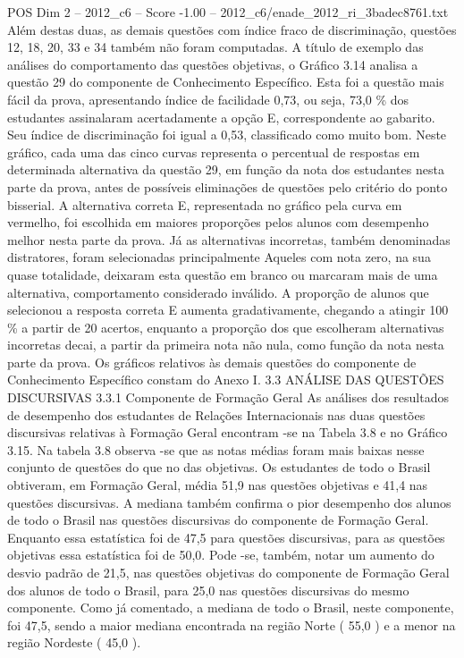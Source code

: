 \begin{textsample}{POS Dim 2 – 2012\_c6 – Score -1.00 – 2012\_c6/enade\_2012\_ri\_3badec8761.txt}
Além destas duas, as demais questões com índice fraco de discriminação, questões 12, 18, 20, 33 e 34 também não foram computadas.
A título de exemplo das análises do comportamento das questões objetivas, o Gráfico 3.14 analisa a questão 29 do componente de Conhecimento Específico.
Esta foi a questão mais fácil da prova, apresentando índice de facilidade 0,73, ou seja, 73,0 \% dos estudantes assinalaram acertadamente a opção E, correspondente ao gabarito.
Seu índice de discriminação foi igual a 0,53, classificado como muito bom.
Neste gráfico, cada uma das cinco curvas representa o percentual de respostas em determinada alternativa da questão 29, em função da nota dos estudantes nesta parte da prova, antes de possíveis eliminações de questões pelo critério do ponto bisserial.
A alternativa correta E, representada no gráfico pela curva em vermelho, foi escolhida em maiores proporções pelos alunos com desempenho melhor nesta parte da prova.
Já as alternativas incorretas, também denominadas distratores, foram selecionadas principalmente Aqueles com nota zero, na sua quase totalidade, deixaram esta questão em branco ou marcaram mais de uma alternativa, comportamento considerado inválido.
A proporção de alunos que selecionou a resposta correta E aumenta gradativamente, chegando a atingir 100 \% a partir de 20 acertos, enquanto a proporção dos que escolheram alternativas incorretas decai, a partir da primeira nota não nula, como função da nota nesta parte da prova.
Os gráficos relativos às demais questões do componente de Conhecimento Específico constam do Anexo I. 3.3 ANÁLISE DAS QUESTÕES DISCURSIVAS 3.3.1 Componente de Formação Geral As análises dos resultados de desempenho dos estudantes de Relações Internacionais nas duas questões discursivas relativas à Formação Geral encontram -se na Tabela 3.8 e no Gráfico 3.15.
Na tabela 3.8 observa -se que as notas médias foram mais baixas nesse conjunto de questões do que no das objetivas.
Os estudantes de todo o Brasil obtiveram, em Formação Geral, média 51,9 nas questões objetivas e 41,4 nas questões discursivas.
A mediana também confirma o pior desempenho dos alunos de todo o Brasil nas questões discursivas do componente de Formação Geral.
Enquanto essa estatística foi de 47,5 para questões discursivas, para as questões objetivas essa estatística foi de 50,0.
Pode -se, também, notar um aumento do desvio padrão de 21,5, nas questões objetivas do componente de Formação Geral dos alunos de todo o Brasil, para 25,0 nas questões discursivas do mesmo componente.
Como já comentado, a mediana de todo o Brasil, neste componente, foi 47,5, sendo a maior mediana encontrada na região Norte ( 55,0 ) e a menor na região Nordeste ( 45,0 ).

\end{textsample}
